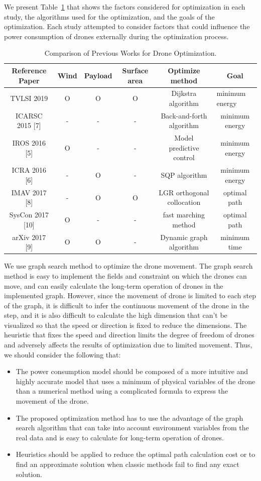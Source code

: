 \documentclass[journal]{./template/IEEEtran}
\begin{document}
We present Table~\ref{Table: survay_result} that shows the factors considered for optimization in each study, the algorithms used for the optimization, and the goals of the optimization.
Each study attempted to consider factors that could influence the power consumption of drones externally during the optimization process. 
\begin{table}[ht]
\caption{Comparison of Previous Works for Drone Optimization.}
\label{Table: survay_result}
\centering
\begin{tabular}{|c|c|c|c|c|c|}
\hline
Reference Paper & Wind & Payload & Surface area & Optimize method & Goal \\ \hline
TVLSI 2019 & O & O & O & Dijkstra algorithm & \multicolumn{1}{l|}{minimum energy} \\ \hline
ICARSC 2015 {[}7{]} & - & - & - & Back-and-forth algorithm & minimum energy \\ \hline
IROS 2016 {[}5{]} & O  & - & - & Model predictive control & minimum energy \\ \hline
ICRA 2016 {[}6{]} & - & O & - & SQP algorithm & minimum energy \\ \hline
IMAV 2017 {[}8{]} & - & O & O & LGR orthogonal collocation & optimal path \\ \hline
SysCon 2017 {[}10{]} & O & - & - & fast marching method & optimal path \\ \hline
arXiv 2017 {[}9{]} & O & O & - & Dynamic graph algorithm & minimum time \\ \hline
\end{tabular}
\end{table}

We use graph search method to optimize the drone movement. The graph search method is easy to implement the fields and constraint on which the drones can move, and can easily calculate the long-term operation of drones in the implemented graph.
However, since the movement of drone is limited to each step of the graph, it is difficult to infer the continuous movement of the drone in the step, and it is also difficult to calculate the high dimension that can’t be visualized so that the speed or direction is fixed to reduce the dimensions.
The heuristic that fixes the speed and direction limits the degree of freedom of drones and adversely affects the results of optimization due to limited movement.
Thus, we should consider the following that: 
\begin{itemize}
    \item The power consumption model should be composed of a more intuitive and highly accurate model that uses a minimum of physical variables of the drone than a numerical method using a complicated formula to express the movement of the drone.
    \item The proposed optimization method has to use the advantage of the graph search algorithm that can take into account environment variables from the real data and is easy to calculate for long-term operation of drones.
    \item Heuristics should be applied to reduce the optimal path calculation cost or to find an approximate solution when classic methods fail to find any exact solution.
\end{itemize}
\end{document}

